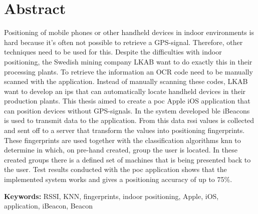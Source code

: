 \newpage
\chapter*{Abstract}
Positioning of mobile phones or other handheld devices in indoor environments is hard because it's often not possible to retrieve a GPS-signal.
Therefore, other techniques need to be used for this.
Despite the difficulties with indoor positioning, the Swedish mining company LKAB want to do exactly this in their processing plants.
To retrieve the information an OCR code need to be manually scanned with the application.
Instead of manually scanning these codes, LKAB want to develop an \acrlong{ips} that can automatically locate handheld devices in their production plants.
This thesis aimed to create a \acrlong{poc} Apple iOS application that can position devices without GPS-signals.
In the system developed \acrlong{ble} iBeacons is used to transmit data to the application.
From this data \acrlong{rssi} values is  collected and sent off to a server that transform the values into positioning fingerprints.
These fingerprints are used together with the classification algorithms \acrlong{knn} to determine in which, on pre-hand created, group the user is located.
In these created groups there is a defined set of machines that is being presented back to the user.
Test results conducted with the \acrlong{poc} application shows that the implemented system works and gives a positioning accuracy of up to 75\%.


\bigskip

\textbf{Keywords:} RSSI, KNN, fingerprints, indoor positioning, Apple, iOS, application, iBeacon, Beacon
